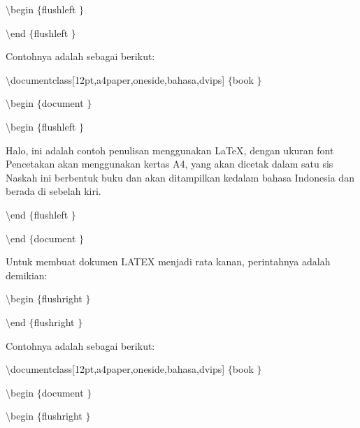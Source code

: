 \begin{enumerate}
{\fontsize{10pt}{10pt}\selectfont  $  \setminus  $begin $  \{  $flushleft $  \}  $} \par
{\fontsize{10pt}{10pt}\selectfont [kalimat]} \par
{\fontsize{10pt}{10pt}\selectfont  $  \setminus  $end $  \{  $flushleft $  \}  $} \par
\vspace{12pt}
Contohnya adalah sebagai berikut: \par
{\fontsize{10pt}{10pt}\selectfont  $  \setminus  $documentclass[12pt,a4paper,oneside,bahasa,dvips] $  \{  $book $  \}  $} \par
{\fontsize{10pt}{10pt}\selectfont  $  \setminus  $begin $  \{  $document $  \}  $} \par
{\fontsize{10pt}{10pt}\selectfont  $  \setminus  $begin $  \{  $flushleft $  \}  $} \par
\vspace{9pt}
{\fontsize{10pt}{10pt}\selectfont Halo, ini adalah contoh penulisan menggunakan LaTeX, dengan ukuran font Pencetakan akan menggunakan kertas A4, yang akan dicetak dalam satu sis Naskah ini berbentuk buku dan akan ditampilkan kedalam bahasa Indonesia dan berada di sebelah kiri.} \par
\vspace{9pt}
{\fontsize{10pt}{10pt}\selectfont  $  \setminus  $end $  \{  $flushleft $  \}  $} \par
{\fontsize{10pt}{10pt}\selectfont  $  \setminus  $end $  \{  $document $  \}  $} \par
\vspace{12pt}
Untuk membuat dokumen LATEX menjadi rata kanan, perintahnya adalah demikian: \par
{\fontsize{10pt}{10pt}\selectfont  $  \setminus  $begin $  \{  $flushright $  \}  $} \par
{\fontsize{10pt}{10pt}\selectfont [kalimat]} \par
{\fontsize{10pt}{10pt}\selectfont  $  \setminus  $end $  \{  $flushright $  \}  $} \par
\vspace{12pt}
Contohnya adalah sebagai berikut: \par
{\fontsize{10pt}{10pt}\selectfont  $  \setminus  $documentclass[12pt,a4paper,oneside,bahasa,dvips] $  \{  $book $  \}  $} \par
{\fontsize{10pt}{10pt}\selectfont  $  \setminus  $begin $  \{  $document $  \}  $} \par
{\fontsize{10pt}{10pt}\selectfont  $  \setminus  $begin $  \{  $flushright $  \}  $} \par

\end{enumerate}
